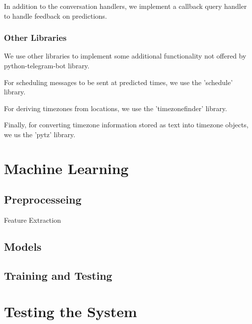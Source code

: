 In addition to the conversation handlers, we implement a callback query handler to handle feedback on predictions.

\subsubsection{Other Libraries}
We use other libraries to implement some additional functionality not offered by python-telegram-bot library.

For scheduling messages to be sent at predicted times, we use the 'schedule' library.

For deriving timezones from locations, we use the 'timezonefinder' library.

Finally, for converting timezone information stored as text into timezone objects, we us the 'pytz' library.

\section{Machine Learning}
\subsection{Preprocesseing}
Feature Extraction
\subsection{Models}
\subsection{Training and Testing}
\section{Testing the System}
